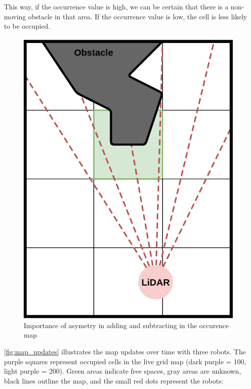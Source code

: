 \documentclass[../main.tex]{subfiles}
\begin{document}
\vspace{1em}

This way, if the occurrence value is high, we can be certain that there is a non-moving obstacle in that area. If the occurrence value is low, the cell is less likely to be occupied.

\begin{figure}[H]
	\centering
	\includegraphics[width=0.4\linewidth]{IMAGES/part2/lidar_occurance_map.png}
	\caption{Importance of asymetry in adding and subtracting in the occurence map}
	\label{fig:lidar_occurence_map}
\end{figure}

\autoref{fig:map_updates} illustrates the map updates over time with three robots. The purple squares represent occupied cells in the live grid map (dark purple = 100, light purple = 200). Green areas indicate free spaces, gray areas are unknown, black lines outline the map, and the small red dots represent the robots:
\end{document}
